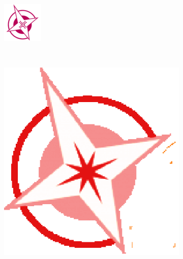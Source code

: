 \documentclass[11pt,a5]{article}
\begin{document}
\begin{figure}[h]
\begin{subfigure}[b]{0.12\textwidth}
        \end{subfigure}%
        ~
        \begin{subfigure}[b]{0.12\textwidth}
                \centering
                \includegraphics[width=\textwidth]{img/logo_geoinquietoscan}
        \end{subfigure}%
        ~
        \begin{subfigure}[b]{0.12\textwidth}
                \centering
                \includegraphics[width=\textwidth]{img/logo_geoinquietosmad}

\end{subfigure}
\end{figure}
\end{document}

